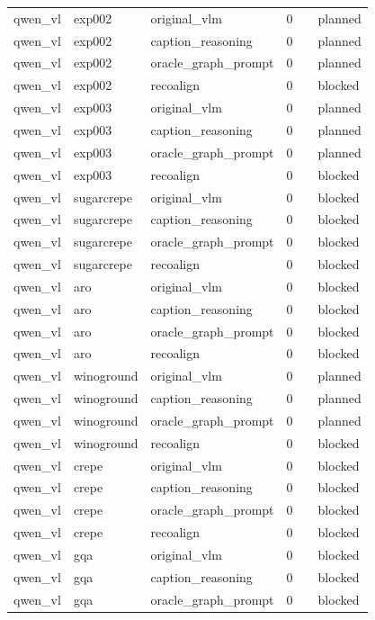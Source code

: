 \begin{table}[t]
\begin{tabular}{llllll}
qwen\_vl & exp002 & original\_vlm & 0 &  & planned \\
qwen\_vl & exp002 & caption\_reasoning & 0 &  & planned \\
qwen\_vl & exp002 & oracle\_graph\_prompt & 0 &  & planned \\
qwen\_vl & exp002 & recoalign & 0 &  & blocked \\
qwen\_vl & exp003 & original\_vlm & 0 &  & planned \\
qwen\_vl & exp003 & caption\_reasoning & 0 &  & planned \\
qwen\_vl & exp003 & oracle\_graph\_prompt & 0 &  & planned \\
qwen\_vl & exp003 & recoalign & 0 &  & blocked \\
qwen\_vl & sugarcrepe & original\_vlm & 0 &  & blocked \\
qwen\_vl & sugarcrepe & caption\_reasoning & 0 &  & blocked \\
qwen\_vl & sugarcrepe & oracle\_graph\_prompt & 0 &  & blocked \\
qwen\_vl & sugarcrepe & recoalign & 0 &  & blocked \\
qwen\_vl & aro & original\_vlm & 0 &  & blocked \\
qwen\_vl & aro & caption\_reasoning & 0 &  & blocked \\
qwen\_vl & aro & oracle\_graph\_prompt & 0 &  & blocked \\
qwen\_vl & aro & recoalign & 0 &  & blocked \\
qwen\_vl & winoground & original\_vlm & 0 &  & planned \\
qwen\_vl & winoground & caption\_reasoning & 0 &  & planned \\
qwen\_vl & winoground & oracle\_graph\_prompt & 0 &  & planned \\
qwen\_vl & winoground & recoalign & 0 &  & blocked \\
qwen\_vl & crepe & original\_vlm & 0 &  & blocked \\
qwen\_vl & crepe & caption\_reasoning & 0 &  & blocked \\
qwen\_vl & crepe & oracle\_graph\_prompt & 0 &  & blocked \\
qwen\_vl & crepe & recoalign & 0 &  & blocked \\
qwen\_vl & gqa & original\_vlm & 0 &  & blocked \\
qwen\_vl & gqa & caption\_reasoning & 0 &  & blocked \\
qwen\_vl & gqa & oracle\_graph\_prompt & 0 &  & blocked \\

\end{tabular}
\end{table}
